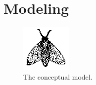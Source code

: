 \section{Modeling}
\label{sec:modeling}


\lipsum[1]


\lipsum[1]

\begin{figure}
  \label{fig:conceptual-model}
  \includegraphics{fig/fly}
  \caption{The conceptual model.}
\end{figure}

\lipsum[1]

\lipsum[1]

\lipsum[1]
